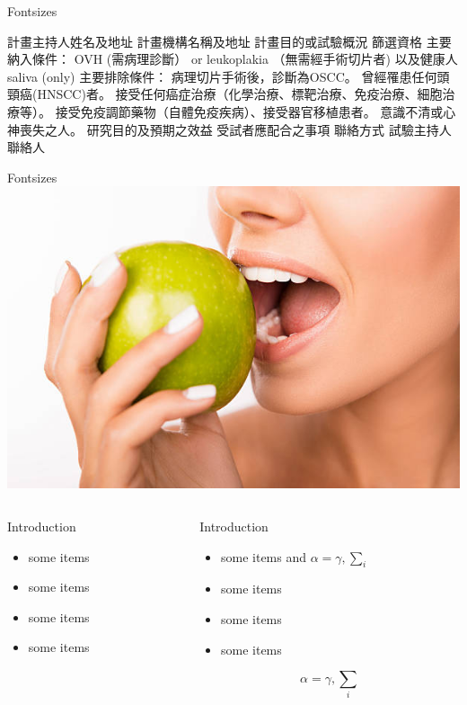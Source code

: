 \documentclass{beamer}
\begin{document}
\begin{frame}{}
\begin{block}{\large Fontsizes}
\begin{outline}
\1 計畫主持人姓名及地址
\1 計畫機構名稱及地址
\1 計畫目的或試驗概況
\1 篩選資格
    \2 主要納入條件：
        \3 OVH (需病理診斷） or leukoplakia （無需經手術切片者)
        \3 以及健康人 saliva (only)
    \2 主要排除條件：
        \3 病理切片手術後，診斷為OSCC。
        \3 曾經罹患任何頭頸癌(HNSCC)者。
        \3 接受任何癌症治療（化學治療、標靶治療、免疫治療、細胞治療等）。
        \3 接受免疫調節藥物（自體免疫疾病）、接受器官移植患者。
        \3 意識不清或心神喪失之人。
\1  研究目的及預期之效益
\1  受試者應配合之事項
\1  聯絡方式
    \2 試驗主持人
    \2 聯絡人
\end{outline}
    \end{block}
    \vfill
    \vfill
    \begin{block}{\large Fontsizes}
      \centering
        \includegraphics[width=0.5\linewidth]{istockphoto-622282400-612x612.jpg}
    \end{block}
    \vfill
    \begin{columns}[t]
      \begin{column}{.30\linewidth}
        \begin{block}{Introduction}
          \begin{itemize}
          \item some items
          \item some items
          \item some items
          \item some items
          \end{itemize}
        \end{block}
      \end{column}
      \begin{column}{.48\linewidth}
        \begin{block}{Introduction}
          \begin{itemize}
          \item some items and $\alpha=\gamma, \sum_{i}$
          \item some items
          \item some items
          \item some items
          \end{itemize}
          $$\alpha=\gamma, \sum_{i}$$
        \end{block}


\end{column}
\end{columns}
\end{frame}
\end{document}
